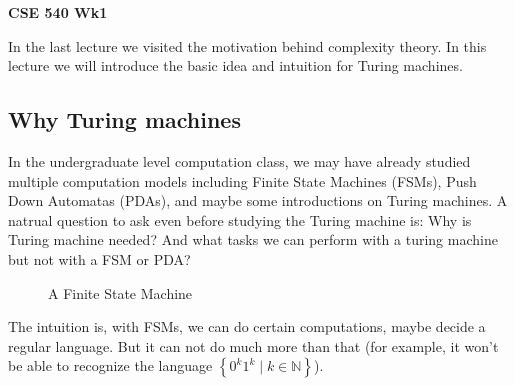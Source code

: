 \documentclass[a4paper,12pt]{article}
\date{\displaydate{date}}
\theoremstyle{example}
\theoremstyle{definition}
\theoremstyle{remark}
\begin{document}

\begin{center}
    \Large \textbf{CSE 540 Wk1} \\ %
    \vspace{0.5cm}
    \large {}
    \vspace{0.5cm}
\end{center}

In the last lecture we visited the motivation behind complexity theory. In this lecture we will introduce the basic idea and intuition for Turing machines.

\subsection{Why Turing machines}

In the undergraduate level computation class, we may have already studied multiple computation models including Finite State Machines (FSMs), Push Down Automatas (PDAs), and maybe some introductions on Turing machines. A natrual question to ask even before studying the Turing machine is: Why is Turing machine needed? And what tasks we can perform with a turing machine but not with a FSM or PDA?



\begin{figure}[h]
    \centering
    \caption{A Finite State Machine}
    \label{fig:fsm}
\end{figure}

The intuition is, with FSMs, we can do certain computations, maybe decide a regular language. But it can not do much more than that (for example, it won't be able to recognize the language $\left\{0^k1^k \mid k \in \mathbb{N} \right\}$).
\end{document}
